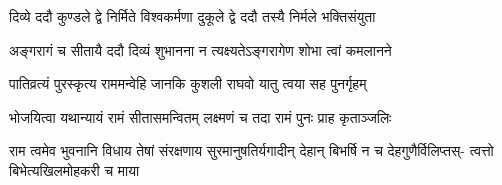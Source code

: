 \twolineshloka
{दिव्ये ददौ कुण्डले द्वे निर्मिते विश्वकर्मणा}
{दुकूले द्वे ददौ तस्यै निर्मले भक्तिसंयुता} %

\twolineshloka
{अङ्गरागं च सीतायै ददौ दिव्यं शुभानना}
{न त्यक्ष्यतेऽङ्गरागेण शोभा त्वां कमलानने} %

\twolineshloka
{पातिव्रत्यं पुरस्कृत्य राममन्वेहि जानकि}
{कुशली राघवो यातु त्वया सह पुनर्गृहम्} %

\twolineshloka
{भोजयित्वा यथान्यायं रामं सीतासमन्वितम्}
{लक्ष्मणं च तदा रामं पुनः प्राह कृताञ्जलिः} %

\fourlineindentedshloka
{राम त्वमेव भुवनानि विधाय तेषां}
{संरक्षणाय सुरमानुषतिर्यगादीन्}
{देहान् बिभर्षि न च देहगुणैर्विलिप्तस्-}
{त्वत्तो बिभेत्यखिलमोहकरी च माया} %


